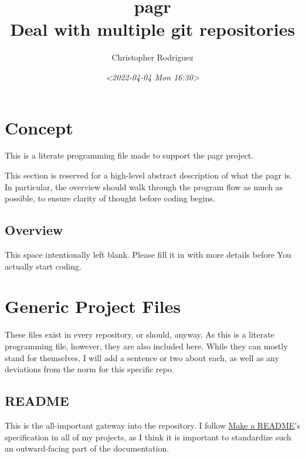 \documentclass[11pt]{article}
\author{Christopher Rodriguez}
\date{\textit{<2022-04-04 Mon 16:30>}}
\title{pagr\\\medskip
\large Deal with multiple git repositories}
\begin{document}
\maketitle
\tableofcontents

\section{Concept}
\label{sec:org6bd776c}
This is a literate programming file made to support the pagr
project.

This section is reserved for a high-level abstract description of what the
pagr is. In particular, the overview should walk through the
program flow as much as possible, to ensure clarity of thought before coding
begins.
\subsection{Overview}
\label{sec:org1dfd2ec}
This space intentionally left blank. Please fill it in with more details before
You actually start coding.

\section{Generic Project Files}
\label{sec:org9d77092}
These files exist in every repository, or should, anyway. As this is a literate
programming file, however, they are also included here. While they can mostly
stand for themselves, I will add a sentence or two about each, as well as any
deviations from the norm for this specific repo.

\subsection{README}
\label{sec:org9e0a8aa}
This is the all-important gateway into the repository. I follow \href{https://www.makeareadme.com/}{Make a README}'s
specification in all of my projects, as I think it is important to standardize
such an outward-facing part of the documentation.
\end{document}
